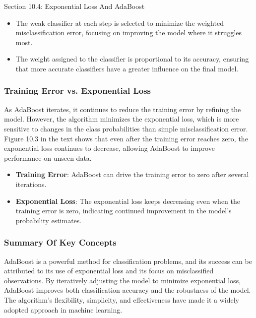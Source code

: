 \begin{notes}{Section 10.4: Exponential Loss And AdaBoost}
    \begin{highlight}
        \begin{itemize}
            \item The weak classifier at each step is selected to minimize the weighted misclassification error, focusing on improving the model where it struggles most.
            \item The weight assigned to the classifier is proportional to its accuracy, ensuring that more accurate classifiers have a greater influence on the final model.
        \end{itemize}
    \end{highlight}
    
    \subsubsection*{Training Error vs. Exponential Loss}
    
    As AdaBoost iterates, it continues to reduce the training error by refining the model. However, the algorithm minimizes the exponential loss, which is more sensitive to changes in the class probabilities 
    than simple misclassification error. Figure 10.3 in the text shows that even after the training error reaches zero, the exponential loss continues to decrease, allowing AdaBoost to improve performance 
    on unseen data.
    
    \begin{highlight}
        \begin{itemize}
            \item \textbf{Training Error}: AdaBoost can drive the training error to zero after several iterations.
            \item \textbf{Exponential Loss}: The exponential loss keeps decreasing even when the training error is zero, indicating continued improvement in the model's probability estimates.
        \end{itemize}
    \end{highlight}
    
    \subsubsection*{Summary Of Key Concepts}
    
    AdaBoost is a powerful method for classification problems, and its success can be attributed to its use of exponential loss and its focus on misclassified observations. By iteratively adjusting the model 
    to minimize exponential loss, AdaBoost improves both classification accuracy and the robustness of the model. The algorithm's flexibility, simplicity, and effectiveness have made it a widely adopted 
    approach in machine learning.
    

\end{notes}
